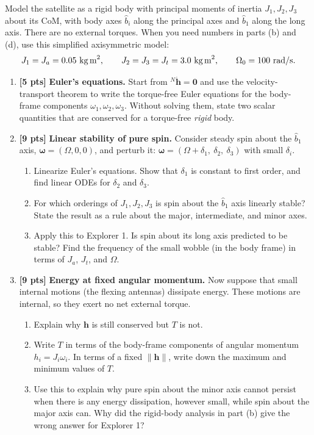 \documentclass[11pt,letterpaper]{article}
\newcommand{\answerspace}[1]{\par\vspace{#1}}
\newcommand{\exampagebreak}{\newpage}
\newcommand{\pts}[1]{\textbf{[#1 pts]}}
\newcommand{\bw}{\boldsymbol{\omega}}
\newcommand{\bh}{\mathbf{h}}
\begin{document}
Model the satellite as a rigid body with principal moments of inertia $J_1, J_2, J_3$ about its CoM, with body axes $\hat b_i$ along the principal axes and $\hat b_1$ along the long axis. There are no external torques. When you need numbers in parts (b) and (d), use this simplified axisymmetric model:
\[
J_1 = J_a = 0.05~\text{kg\,m}^2, \qquad J_2 = J_3 = J_t = 3.0~\text{kg\,m}^2, \qquad \Omega_0 = 100~\text{rad/s}.
\]

\begin{enumerate}[label=(\alph*)]

\exampagebreak
\item \pts{5} \textbf{Euler's equations.} Start from ${}^{N}\dot{\bh} = \mathbf{0}$ and use the velocity-transport theorem to write the torque-free Euler equations for the body-frame components $\omega_1, \omega_2, \omega_3$. Without solving them, state two scalar quantities that are conserved for a torque-free \emph{rigid} body.
\answerspace{5.0in}
\exampagebreak

\item \pts{9} \textbf{Linear stability of pure spin.} Consider steady spin about the $\hat{b}_1$ axis, $\bw = (\Omega, 0, 0)$, and perturb it: $\bw = (\Omega + \delta_1,\ \delta_2,\ \delta_3)$ with small $\delta_i$.
\begin{enumerate}[label=(\roman*)]
    \item Linearize Euler's equations. Show that $\delta_1$ is constant to first order, and find linear ODEs for $\delta_2$ and $\delta_3$.
\answerspace{2.8in}
    \item For which orderings of $J_1, J_2, J_3$ is spin about the $\hat{b}_1$ axis linearly stable? State the result as a rule about the major, intermediate, and minor axes.
\answerspace{1.6in}
    \item Apply this to Explorer 1. Is spin about its long axis predicted to be stable? Find the frequency of the small wobble (in the body frame) in terms of $J_a$, $J_t$, and $\Omega$.
\answerspace{2.0in}
\end{enumerate}
\exampagebreak

\item \pts{9} \textbf{Energy at fixed angular momentum.} Now suppose that small internal motions (the flexing antennas) dissipate energy. These motions are internal, so they exert no net external torque.
\begin{enumerate}[label=(\roman*)]
    \item Explain why $\bh$ is still conserved but $T$ is not.
\answerspace{1.6in}
    \item Write $T$ in terms of the body-frame components of angular momentum $h_i = J_i\omega_i$. In terms of a fixed $\lVert\bh\rVert$, write down the maximum and minimum values of $T$.
\answerspace{2.4in}
    \item Use this to explain why pure spin about the minor axis cannot persist when there is any energy dissipation, however small, while spin about the major axis can. Why did the rigid-body analysis in part (b) give the wrong answer for Explorer 1?
\answerspace{2.4in}
\end{enumerate}
\exampagebreak


\end{enumerate}
\end{document}
